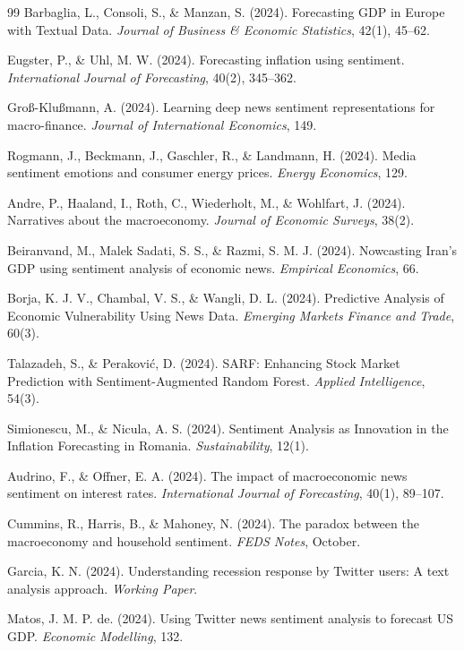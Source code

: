 \documentclass[11pt,twocolumn]{article}
\begin{document}
\begin{thebibliography}{99}
 Barbaglia, L., Consoli, S., \& Manzan, S. (2024). Forecasting GDP in Europe with Textual Data. \textit{Journal of Business \& Economic Statistics}, 42(1), 45--62.

 Eugster, P., \& Uhl, M. W. (2024). Forecasting inflation using sentiment. \textit{International Journal of Forecasting}, 40(2), 345--362.

 Groß-Klußmann, A. (2024). Learning deep news sentiment representations for macro-finance. \textit{Journal of International Economics}, 149.

 Rogmann, J., Beckmann, J., Gaschler, R., \& Landmann, H. (2024). Media sentiment emotions and consumer energy prices. \textit{Energy Economics}, 129.

 Andre, P., Haaland, I., Roth, C., Wiederholt, M., \& Wohlfart, J. (2024). Narratives about the macroeconomy. \textit{Journal of Economic Surveys}, 38(2).

 Beiranvand, M., Malek Sadati, S. S., \& Razmi, S. M. J. (2024). Nowcasting Iran's GDP using sentiment analysis of economic news. \textit{Empirical Economics}, 66.

 Borja, K. J. V., Chambal, V. S., \& Wangli, D. L. (2024). Predictive Analysis of Economic Vulnerability Using News Data. \textit{Emerging Markets Finance and Trade}, 60(3).

 Talazadeh, S., \& Peraković, D. (2024). SARF: Enhancing Stock Market Prediction with Sentiment-Augmented Random Forest. \textit{Applied Intelligence}, 54(3).

 Simionescu, M., \& Nicula, A. S. (2024). Sentiment Analysis as Innovation in the Inflation Forecasting in Romania. \textit{Sustainability}, 12(1).

 Audrino, F., \& Offner, E. A. (2024). The impact of macroeconomic news sentiment on interest rates. \textit{International Journal of Forecasting}, 40(1), 89--107.

 Cummins, R., Harris, B., \& Mahoney, N. (2024). The paradox between the macroeconomy and household sentiment. \textit{FEDS Notes}, October.

 Garcia, K. N. (2024). Understanding recession response by Twitter users: A text analysis approach. \textit{Working Paper}.

 Matos, J. M. P. de. (2024). Using Twitter news sentiment analysis to forecast US GDP. \textit{Economic Modelling}, 132.


\end{thebibliography}
\end{document}
